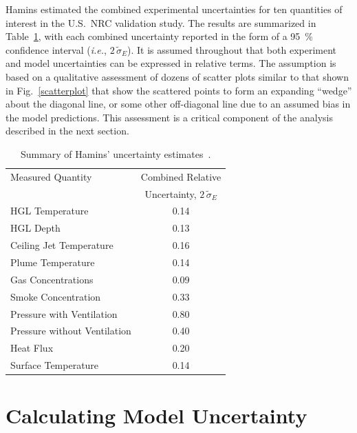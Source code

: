 Hamins estimated the combined experimental uncertainties for ten quantities of interest in the U.S.~NRC validation study.
The results are summarized in Table~\ref{Uncertainty}, with
each combined uncertainty reported in the form of a 95~\% confidence interval ({\em i.e.}, $2 \, \widetilde{\sigma}_E$).
It is assumed throughout that both experiment and model uncertainties can be expressed in relative terms.
The assumption is based on a
qualitative assessment of dozens of scatter plots similar to that shown in Fig.~\ref{scatterplot} that show
the scattered points to form an expanding ``wedge''
about the diagonal line, or some other off-diagonal line due to an assumed bias in the model predictions.
This assessment is a critical component of the
analysis described in the next section.
\begin{table}[ht]
\caption{Summary of Hamins' uncertainty estimates~\cite{NUREG_1824}. }
\begin{center}
\begin{tabular}{|l|c|}
\hline
Measured Quantity               & Combined Relative       \\
                                & Uncertainty, $2 \, \widetilde{\sigma}_E$       \\ \hline \hline
HGL Temperature                 & 0.14    \\ \hline
HGL Depth                       & 0.13    \\ \hline
Ceiling Jet Temperature         & 0.16    \\ \hline
Plume Temperature               & 0.14    \\ \hline
Gas Concentrations              & 0.09    \\ \hline
Smoke Concentration             & 0.33    \\ \hline
Pressure with Ventilation       & 0.80    \\ \hline
Pressure without Ventilation    & 0.40    \\ \hline
Heat Flux                       & 0.20    \\ \hline
Surface Temperature             & 0.14    \\ \hline
\end{tabular}
\end{center}
\label{Uncertainty}
\end{table}



\section{Calculating Model Uncertainty}

